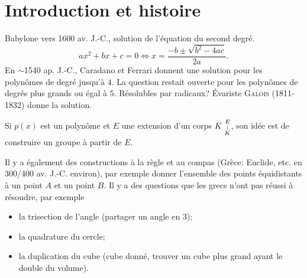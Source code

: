 
\chapter{Introduction et histoire}
Babylone vers 1600 av. J.-C., solution de l'équation du second degré. 
\[ ax^2 + bx + c = 0 \iff x = \frac{-b \pm \sqrt{b^2 - 4ac}}{2a}. \]
En $\sim\!$1540 ap. J.-C., Caradano et Ferrari donnent une solution pour les polynômes de degré jusqu'à $4$. 
La question restait ouverte pour les polynômes de degrés plus grands ou égal à $5$. \og Résolubles par
radicaux\fg{}? Évariste \textsc{Galois} (1811-1832) donne la solution. 

Si $p(x)$ est un polynôme et $E$ une extension d'un corps $K$ $\overset{E}{\underset{K}{\text{\tiny{$|$}}}}$, son idée est de construire un
groupe à partir de $E$.

Il y a également des constructions à la règle et au compas (Grèce: Euclide, etc. en 300/400
av. J.-C. environ), par exemple donner l'ensemble des points équidistants à un point $A$ et un point $B$. Il y
a des questions que les grecs n'ont pas réussi à résoudre, par exemple
\begin{itemize}
\item la trisection de l'angle (partager un angle en 3);
\item la quadrature du cercle;
\item la duplication du cube (cube donné, trouver un cube plus grand ayant le double du volume).
\end{itemize}





  




